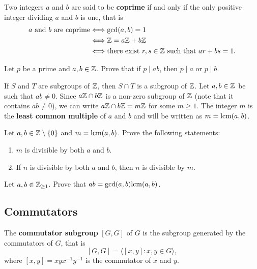 Two integers $a$ and $b$ are said to be \textbf{coprime} if 
and only if the only positive integer dividing 
$a$ and $b$ is one, that is  
\begin{align*}
a\text{ and }b\text{ are coprime}&\Longleftrightarrow \gcd(a,b)=1\\
&\Longleftrightarrow \mathbb{Z}=a\mathbb{Z}+b\mathbb{Z}\\
&\Longleftrightarrow \text{there exist $r,s\in\mathbb{Z}$ such that $ar+bs=1$.}
\end{align*}

\begin{exercise}
        Let $p$ be a prime and 
        $a,b\in\mathbb{Z}$. Prove that if $p\mid ab$, 
        then $p\mid a$ or $p\mid b$.
\end{exercise}

If $S$ and $T$ are subgroups of $\mathbb{Z}$, then $S\cap T$
is a subgroup of $\mathbb{Z}$.
Let $a,b\in\mathbb{Z}$ be such that $ab\ne 0$. Since $a\mathbb{Z}\cap b\mathbb{Z}$ 
is a non-zero subgroup of $\mathbb{Z}$ (note that it contains $ab\ne 0$), 
we can write  $a\mathbb{Z}\cap b\mathbb{Z}=m\mathbb{Z}$
for some $m\geq1$. The integer $m$
is the \textbf{least common multiple} of $a$ and $b$ 
and will be written as $m=\mathrm{lcm}(a,b)$.

\begin{exercise}
Let $a,b\in\mathbb{Z}\setminus\{0\}$ and $m=\mathrm{lcm}(a,b)$. 
Prove the following statements:
\begin{enumerate}
        \item $m$ is divisible by both $a$ and $b$.
        \item If $n$ is divisible by both $a$ and $b$, then 
        $n$ is divisible by $m$.
\end{enumerate}
\end{exercise}

\begin{exercise}
Let $a,b\in\mathbb{Z}_{\geq1}$. Prove that 
$ab=\gcd(a,b)\mathrm{lcm}(a,b)$.
\end{exercise}

\subsection{Commutators}

\begin{definition}
        The \textbf{commutator subgroup}
        $[G,G]$ of $G$ 
        is the subgroup generated by 
        the commutators of $G$, that is 
        \[
        [G,G]=\langle[x,y]: x,y\in G\rangle,
        \]
        where $[x,y]=xyx^{-1}y^{-1}$ is the commutator of 
        $x$ and $y$.
\end{definition}
  

